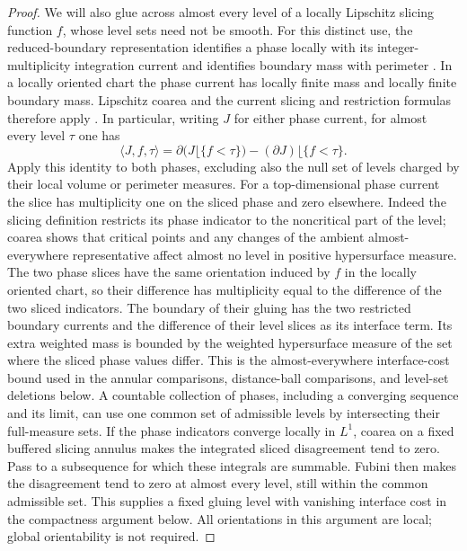 \begin{proof}
We will also glue across almost every level of a locally Lipschitz
slicing function $f$, whose level sets need not be smooth.
For this distinct use, the reduced-boundary representation identifies
a phase locally with its integer-multiplicity integration current and
identifies boundary mass with perimeter
\citep[Chapter~3, Section~4, Equation~(4.1) and Theorem~4.3]{simonGMT}.
In a locally oriented chart the phase current has locally finite mass
and locally finite boundary mass.  Lipschitz coarea and the current
slicing and restriction formulas therefore apply
\citep[Chapter~3, Section~2, Equations~(2.8)--(2.9);
Chapter~6, Section~4, Lemmas~4.1 and~4.5 and
Definition~4.4]{simonGMT}.
In particular, writing $J$ for either phase current, for almost every
level $\tau$ one has
\[
 \langle J,f,\tau\rangle
   =\partial\bigl(J\lfloor\{f<\tau\}\bigr)
             -(\partial J)\lfloor\{f<\tau\}.
\]
Apply this identity to both phases, excluding also the null set of
levels charged by their local volume or perimeter measures.
For a top-dimensional phase current the slice has multiplicity one
on the sliced phase and zero elsewhere.  Indeed the slicing
definition restricts its phase indicator to the noncritical part of
the level; coarea shows that critical points and any changes of the
ambient almost-everywhere representative affect almost no level in
positive hypersurface measure.  The two phase slices have the same
orientation induced by $f$ in the locally oriented chart, so their
difference has multiplicity equal to the difference of the two sliced
indicators.
The boundary of their gluing has the two restricted boundary currents
and the difference of their level slices as its interface term.
Its extra weighted mass is bounded by the weighted hypersurface
measure of the set where the sliced phase values differ.
This is the almost-everywhere interface-cost bound used in the
annular comparisons, distance-ball comparisons, and level-set
deletions below.  A countable collection of phases, including a
converging sequence and its limit, can use one common set of
admissible levels by intersecting their full-measure sets.
If the phase indicators converge locally in $L^1$, coarea on a fixed
buffered slicing annulus makes the integrated sliced disagreement
tend to zero.  Pass to a subsequence for which these integrals are
summable.  Fubini then makes the disagreement tend to zero at almost
every level, still within the common admissible set.
This supplies a fixed gluing level with vanishing interface cost in
the compactness argument below.  All orientations in this argument
are local; global orientability is not required.


\end{proof}
